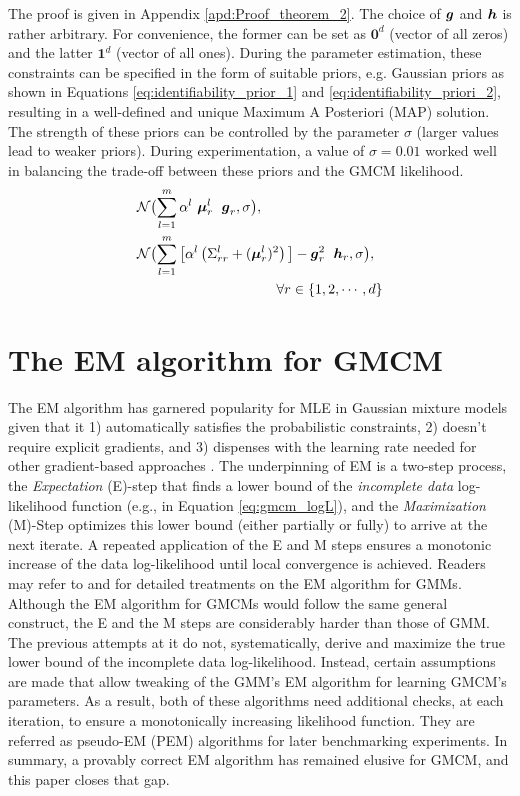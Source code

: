 \documentclass{article}
\theoremstyle{plain}
\theoremstyle{definition}
\theoremstyle{remark}
\begin{document}
The proof is given in Appendix \ref{apd:Proof_theorem_2}. The choice of $\boldsymbol{g}$ and $\boldsymbol{h}$ is rather arbitrary. For convenience, the former can be set as $\mathbf{0}^d$ (vector of all zeros) and the latter $\mathbf{1}^d$ (vector of all ones). During the parameter estimation, these constraints can be specified in the form of suitable priors, e.g. Gaussian priors as shown in Equations \eqref{eq:identifiability_prior_1} and \eqref{eq:identifiability_priori_2}, resulting in a well-defined and unique Maximum A Posteriori (MAP) solution. The strength of these priors can be controlled by the parameter $\sigma$ (larger values lead to weaker priors). During experimentation, a value of $\sigma=0.01$ worked well in balancing the trade-off between these priors and the GMCM likelihood.
\begin{align}
& \mathcal{N}\bigl(\sum_{l=1}^m \alpha^l \ \bs{\mu}_r^l \;\ \bs{g}_r,\sigma \bigr),  \label{eq:identifiability_prior_1} \\
&\mathcal{N}\bigl(\sum_{l=1}^m \big[ \alpha^l \left(\Sigma_{rr}^l+(\bs{\mu}_r^l)^2\right)\big] -\bs{g}_r^2 \; \ \bs{h}_r, \sigma \bigr), \label{eq:identifiability_priori_2}\\
&\qquad \qquad \qquad \qquad \qquad \forall r \in \{1,2,\cdots,d\} \nonumber
\end{align}

\section{The EM algorithm for GMCM}\label{sec:EM}
The EM algorithm has garnered popularity for MLE in Gaussian mixture models given that it 1) automatically satisfies the probabilistic constraints, 2) doesn't require explicit gradients, and 3) dispenses with the learning rate needed for other gradient-based approaches \citep{Xu1996}. The underpinning of EM is a two-step process, the \emph{Expectation} (E)-step that finds a lower bound of the \emph{incomplete data} log-likelihood function (e.g., in Equation \eqref{eq:gmcm_logL}), and the \emph{Maximization} (M)-Step optimizes this lower bound (either partially or fully) to arrive at the next iterate. A repeated application of the E and M steps ensures a monotonic increase of the data log-likelihood until local convergence is achieved. Readers may refer to \citet{Bilmes98agentle} and \citet{Salakhutdinov2002} for detailed treatments on the EM algorithm for GMMs. Although the EM algorithm for GMCMs would follow the same general construct, the E and the M steps are considerably harder than those of GMM. The previous attempts at it \citep{Tewari2011, Bhattacharya2014} do not, systematically, derive and maximize the true lower bound of the incomplete data log-likelihood. Instead, certain assumptions are made that allow tweaking of the GMM's EM algorithm for learning GMCM's parameters. As a result, both of these algorithms need additional checks, at each iteration, to ensure a monotonically increasing likelihood function. They are referred as pseudo-EM (PEM) algorithms for later benchmarking experiments. In summary, a provably correct EM algorithm has remained elusive for GMCM, and this paper closes that gap.
\end{document}
